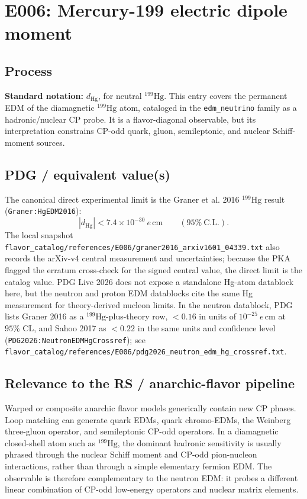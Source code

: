 
\section{E006: Mercury-199 electric dipole moment}

\subsection*{Process}
\textbf{Standard notation:} \(d_{\mathrm{Hg}}\), for neutral
\(^{199}\mathrm{Hg}\).  This entry covers the permanent EDM of the
diamagnetic \(^{199}\mathrm{Hg}\) atom, cataloged in the
\texttt{edm\_neutrino} family as a hadronic/nuclear CP probe.  It is a
flavor-diagonal observable, but its interpretation constrains CP-odd quark,
gluon, semileptonic, and nuclear Schiff-moment sources.

\subsection*{PDG / equivalent value(s)}
The canonical direct experimental limit is the Graner et al. 2016
\(^{199}\mathrm{Hg}\) result (\texttt{Graner:HgEDM2016}):
\[
  |d_{\mathrm{Hg}}| < 7.4\times 10^{-30}\ e\,\mathrm{cm}
  \qquad (95\%~\mathrm{C.L.}).
\]
The local snapshot
\texttt{flavor\_catalog/references/E006/graner2016\_arxiv1601\_04339.txt}
also records the arXiv-v4 central measurement and uncertainties; because the
PKA flagged the erratum cross-check for the signed central value, the direct
limit is the catalog value.  PDG Live 2026 does not expose a standalone
Hg-atom datablock here, but the neutron and proton EDM datablocks cite the
same Hg measurement for theory-derived nucleon limits.  In the neutron
datablock, PDG lists Graner 2016 as a \(^{199}\mathrm{Hg}\)-plus-theory row,
\(<0.16\) in units of \(10^{-25}\ e\,\mathrm{cm}\) at \(95\%\) CL, and
Sahoo 2017 as \(<0.22\) in the same units and confidence level
(\texttt{PDG2026:NeutronEDMHgCrossref}); see
\texttt{flavor\_catalog/references/E006/pdg2026\_neutron\_edm\_hg\_crossref.txt}.

\subsection*{Relevance to the RS / anarchic-flavor pipeline}
Warped or composite anarchic flavor models generically contain new CP phases.
Loop matching can generate quark EDMs, quark chromo-EDMs, the Weinberg
three-gluon operator, and semileptonic CP-odd operators.  In a diamagnetic
closed-shell atom such as \(^{199}\mathrm{Hg}\), the dominant hadronic
sensitivity is usually phrased through the nuclear Schiff moment and
CP-odd pion-nucleon interactions, rather than through a simple elementary
fermion EDM.  The observable is therefore complementary to the neutron EDM:
it probes a different linear combination of CP-odd low-energy operators and
nuclear matrix elements.

